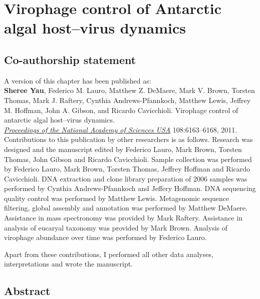 \chapter{Virophage control of Antarctic algal host--virus dynamics}
\label{ch:olv}
\acresetall

\section*{Co-authorship statement}

A version of this chapter has been published as:\\

\textbf{Sheree Yau}, Federico M. Lauro, Matthew Z. DeMaere, Mark V. Brown, Torsten Thomas,
Mark J. Raftery, Cynthia Andrews-Pfannkoch, Matthew Lewis, Jeffrey M. Hoffman, John A. Gibson, and
Ricardo Cavicchioli.
Virophage control of antarctic algal host--virus dynamics.\\
\emph{\underline{Proceedings of the National Academy of Sciences USA}}
108:6163--6168, 2011.\\

Contributions to this publication by other researchers is as follows.
Research was designed and the manuscript edited by Federico Lauro, Mark Brown, Torsten Thomas, John Gibson and Ricardo Cavicchioli.
Sample collection was performed by Federico Lauro, Mark Brown, Torsten Thomas, Jeffrey Hoffman and Ricardo Cavicchioli.
\textsc{DNA} extraction and clone library preparation of 2006 samples was performed by Cynthia Andrews-Pfannkoch and Jeffery Hoffman.
\textsc{DNA} sequencing quality control was performed by Matthew Lewis.
Metagenomic sequence filtering, global assembly and annotation was performed by Matthew DeMaere.
Assistance in mass spectronomy was provided by Mark Raftery.
Assistance in analysis of eucaryal taxonomy was provided by Mark Brown.
Analysis of virophage abundance over time was performed by Federico Lauro.

Apart from these contributions, I performed all other data analyses, interpretations and wrote the manuscript.
\newpage


\section{Abstract}

